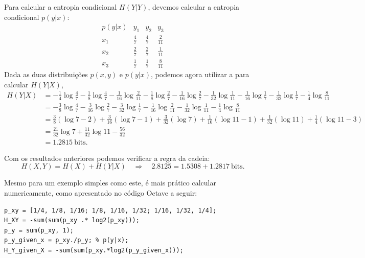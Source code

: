 \begin{example}
Para calcular a entropia condicional $H(Y|Y)$, devemos calcular a entropia condicional $p(y|x)$:
\begin{equation*}
\begin{array}{c|ccc}
p(y|x) & y_1 & y_2 & y_3 \\
\hline
x_1 & \frac{4}{7} & \frac{4}{7} & \frac{2}{11} \\
x_2 & \frac{2}{7} & \frac{2}{7} & \frac{1}{11} \\
x_3 & \frac{1}{7} & \frac{1}{7} & \frac{8}{11} 
\end{array}
\end{equation*}
Dada as duas distribuições $p(x,y)$ e $p(y|x)$, podemos agora utilizar a
 para calcular $H(Y|X)$, 
\begin{align*}
    H(Y|X) &= - \frac{1}{4}\log\frac{4}{7} - \frac{1}{8}\log\frac{4}{7} - \frac{1}{16}\log\frac{2}{11} 
              - \frac{1}{8}\log\frac{2}{7} - \frac{1}{16}\log\frac{2}{7} - \frac{1}{32}\log\frac{1}{11} 
	      - \frac{1}{16}\log\frac{1}{7} - \frac{1}{32}\log\frac{1}{7} - \frac{1}{4}\log\frac{8}{11} \\
	   &= - \frac{3}{8}\log\frac{4}{7} - \frac{3}{16}\log\frac{2}{7} - \frac{3}{32}\log\frac{1}{7} 
	      - \frac{1}{16}\log\frac{2}{11} - \frac{1}{32}\log\frac{1}{11} - \frac{1}{4}\log\frac{8}{11}\\
	   &= \frac{3}{8}(\log 7 - 2) + \frac{3}{16}(\log 7 - 1) + \frac{3}{32}(\log 7) 
	      + \frac{1}{16}(\log 11 - 1) + \frac{1}{32}(\log 11) + \frac{1}{4}(\log 11 - 3)  \\
	   &= \frac{21}{32}\log 7 + \frac{11}{32}\log 11  - \frac{56}{32}\\
	   &= 1.2815  \ \text{bits}.
\end{align*}

Com os resultados anteriores podemos verificar a regra da cadeia:
\begin{equation*}
H(X,Y) = H(X) + H(Y|X) \quad \Rightarrow \quad 2.8125 = 1.5308 + 1.2817 \ \text{bits}.
\end{equation*}

Mesmo para um exemplo simples como este, é mais prático calcular
numericamente, como apresentado no código Octave a seguir:
\begin{verbatim}
p_xy = [1/4, 1/8, 1/16; 1/8, 1/16, 1/32; 1/16, 1/32, 1/4];
H_XY = -sum(sum(p_xy .* log2(p_xy)));
p_y = sum(p_xy, 1);
p_y_given_x = p_xy./p_y; % p(y|x);
H_Y_given_X = -sum(sum(p_xy.*log2(p_y_given_x)));
\end{verbatim}
\end{example}








